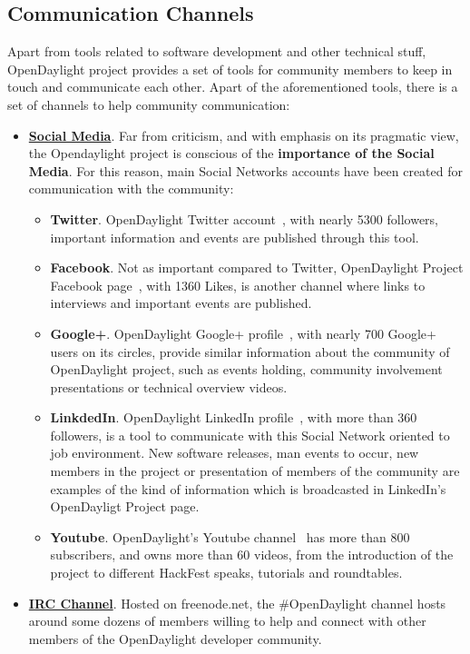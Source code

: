 \documentclass[a4paper, 12pt]{book}
\begin{document}
\subsection{Communication Channels}
Apart from tools related to software development and other technical stuff, OpenDaylight project provides a set of tools for community members to keep in touch and communicate each other. Apart of the aforementioned tools, there is a set of channels to help community communication:
\begin{itemize}\itemsep0pt
\item{\textbf{\underline{Social Media}}}. Far from criticism, and with emphasis on its pragmatic view, the Opendaylight project is conscious of the \textbf{importance of the Social Media}. For this reason, main Social Networks accounts have been created for communication with the community:
\begin{itemize}\itemsep0pt
\item{\textbf{Twitter}}. OpenDaylight Twitter account~\cite{OpenDaylightTwitter}, with nearly 5300 followers, important information and events are published through this tool.
\item{\textbf{Facebook}}. Not as important compared to Twitter, OpenDaylight Project Facebook page~\cite{OpenDaylightFacebook}, with 1360 Likes, is another channel where links to interviews and important events are published.
\item{\textbf{Google+}}. OpenDaylight Google+ profile~\cite{OpenDaylightGooglePlus}, with nearly 700 Google+ users on its circles, provide similar information about the community of OpenDaylight project, such as events holding, community involvement presentations or technical overview videos.
\item{\textbf{LinkdedIn}}. OpenDaylight LinkedIn profile~\cite{OpenDaylightLinkedIn}, with more than 360 followers, is a tool to communicate with this Social Network oriented to job environment. New software releases, man events to occur, new members in the project or presentation of members of the community are examples of the kind of information which is broadcasted in LinkedIn's OpenDayligt Project page.
\item{\textbf{Youtube}}. OpenDaylight's Youtube channel~\cite{OpenDaylightYoutube} has more than 800 subscribers, and owns more than 60 videos, from the introduction of the project to different HackFest speaks, tutorials and roundtables.
\end{itemize}
\item{\textbf{\underline{IRC Channel}}}. Hosted on freenode.net, the \#OpenDaylight channel hosts around some dozens of members willing to help and connect with other members of the OpenDaylight developer community.

\end{itemize}
\end{document}
